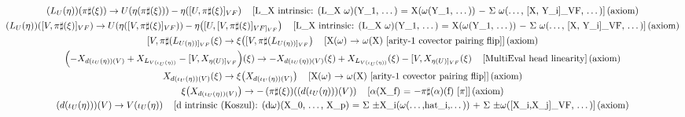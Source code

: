 \documentclass[11pt]{article}
\begin{document}
{\begin{gather*}
\left(L_U\!\left(\eta\right)\right)\!\left(\pi\sharp\!\left(\xi\right)\right) \to U\!\left(\eta\!\left(\pi\sharp\!\left(\xi\right)\right)\right) - \eta\!\left([U,\pi\sharp(\xi)]_{VF}\right) \quad \text{[L\_X intrinsic: (L\_X \ensuremath{\omega})(Y\_1, \ensuremath{\dots}) = X(\ensuremath{\omega}(Y\_1, \ensuremath{\dots})) \ensuremath{-} \ensuremath{\Sigma} \ensuremath{\omega}(\ensuremath{\dots}, [X, Y\_i]\_VF, \ensuremath{\dots})]\,(axiom)} \\
\left(L_U\!\left(\eta\right)\right)\!\left([V,\pi\sharp(\xi)]_{VF}\right) \to U\!\left(\eta\!\left([V,\pi\sharp(\xi)]_{VF}\right)\right) - \eta\!\left([U,[V,\pi\sharp(\xi)]_{VF]_{VF}}\right) \quad \text{[L\_X intrinsic: (L\_X \ensuremath{\omega})(Y\_1, \ensuremath{\dots}) = X(\ensuremath{\omega}(Y\_1, \ensuremath{\dots})) \ensuremath{-} \ensuremath{\Sigma} \ensuremath{\omega}(\ensuremath{\dots}, [X, Y\_i]\_VF, \ensuremath{\dots})]\,(axiom)} \\
[V,\pi\sharp(L_{U(\eta))]_{VF}}\!\left(\xi\right) \to \xi\!\left([V,\pi\sharp(L_{U(\eta))]_{VF}}\right) \quad \text{[X(\ensuremath{\omega}) \ensuremath{\to} \ensuremath{\omega}(X)  [arity-1 covector pairing flip]]\,(axiom)} \\
\left(-X_{d(\iota_U(\eta))(V)} + X_{L_{V(\iota_U(\eta))}} - [V,X_{\eta(U)]_{VF}}\right)\!\left(\xi\right) \to -X_{d(\iota_U(\eta))(V)}\!\left(\xi\right) + X_{L_{V(\iota_U(\eta))}}\!\left(\xi\right) - [V,X_{\eta(U)]_{VF}}\!\left(\xi\right) \quad \text{[MultiEval head linearity]\,(axiom)} \\
X_{d(\iota_U(\eta))(V)}\!\left(\xi\right) \to \xi\!\left(X_{d(\iota_U(\eta))(V)}\right) \quad \text{[X(\ensuremath{\omega}) \ensuremath{\to} \ensuremath{\omega}(X)  [arity-1 covector pairing flip]]\,(axiom)} \\
\xi\!\left(X_{d(\iota_U(\eta))(V)}\right) \to -\left(\pi\sharp\!\left(\xi\right)\right)\!\left(\left(d\!\left(\iota_U\!\left(\eta\right)\right)\right)\!\left(V\right)\right) \quad \text{[\ensuremath{\alpha}(X\_f) = \ensuremath{-}\ensuremath{\pi}\ensuremath{\sharp}(\ensuremath{\alpha})(f) [\ensuremath{\pi}]]\,(axiom)} \\
\left(d\!\left(\iota_U\!\left(\eta\right)\right)\right)\!\left(V\right) \to V\!\left(\iota_U\!\left(\eta\right)\right) \quad \text{[d intrinsic (Koszul): (d\ensuremath{\omega})(X\_0, \ensuremath{\dots}, X\_p) = \ensuremath{\Sigma} \ensuremath{\pm}X\_i(\ensuremath{\omega}(\ensuremath{\dots},hat\_i,\ensuremath{\dots})) + \ensuremath{\Sigma} \ensuremath{\pm}\ensuremath{\omega}([X\_i,X\_j]\_VF, \ensuremath{\dots})]\,(axiom)} \\

\end{gather*}}
\end{document}
